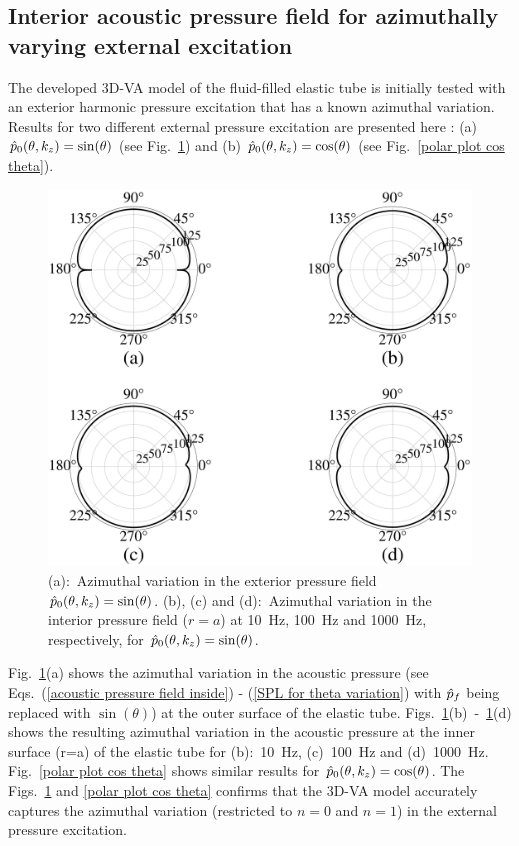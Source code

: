 \documentclass[11pt,cleanfoot]{asme2ej}
\begin{document}
\subsection{Interior acoustic pressure field for azimuthally varying external excitation}
\label{azimuthal excitation}
The developed 3D-VA model of the fluid-filled elastic tube is initially tested with an exterior harmonic pressure excitation that has a known azimuthal variation. Results for two different external pressure excitation are presented here : (a) $\Hat{p}_0(\theta,k_z) = \sin(\theta)$ (see Fig.~\ref{polar plot sin theta}) and (b) $\Hat{p}_0(\theta,k_z) = \cos(\theta)$ (see Fig.~\ref{polar plot cos theta}).


\begin{figure}[ht]
    \centerline{
    \includegraphics[width=4.9in]{polarplot_sin_theta.eps}}
    \caption{(a):~Azimuthal variation in the exterior pressure field $\Hat{p}_0(\theta,k_z) =\sin(\theta)$. (b), (c) and (d):~Azimuthal variation in the interior pressure field ($r=a$) at 10~Hz, 100~Hz and 1000~Hz, respectively, for $\Hat{p}_0(\theta,k_z) =\sin(\theta)$.}
    \label{polar plot sin theta}
\end{figure}

Fig.~\ref{polar plot sin theta}(a) shows the azimuthal variation in the acoustic pressure (see Eqs.~(\ref{acoustic pressure field inside}) - (\ref{SPL for theta variation}) with $\Hat{p}_f$ being replaced with $\sin(\theta)$) at the outer surface of the elastic tube. Figs.~\ref{polar plot sin theta}(b)~-~\ref{polar plot sin theta}(d) shows the resulting azimuthal variation in the acoustic pressure at the inner surface (r=a) of the elastic tube for (b):~10~Hz, (c)~100~Hz and (d)~1000~Hz. Fig.~\ref{polar plot cos theta} shows similar results for $\Hat{p}_0(\theta,k_z) = \cos(\theta)$. The Figs.~\ref{polar plot sin theta} and \ref{polar plot cos theta}
confirms that the 3D-VA model accurately captures the azimuthal variation (restricted to $n=0$ and $n=1$) in the external pressure excitation.
\end{document}

